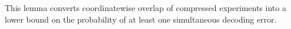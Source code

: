 This lemma converts coordinatewise overlap of compressed experiments into a lower bound on the probability of at least one simultaneous decoding error.